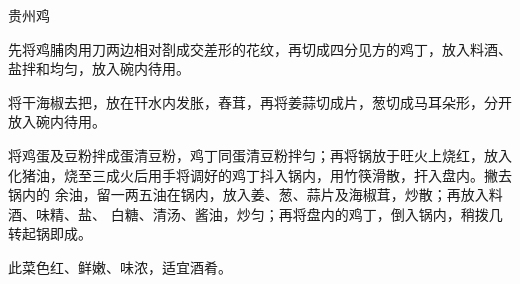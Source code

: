 \begin{recipe}{贵州鸡}

\ingredients


\preparation

\step 先将鸡脯肉用刀两边相对剳成交差形的花纹，再切成四分见方的鸡丁，放入料酒、
盐拌和均匀，放入碗内待用。

\step 将干海椒去把，放在幵水内发胀，舂茸，再将姜蒜切成片，葱切成马耳朵形，分开
放入碗内待用。

\step 将鸡蛋及豆粉拌成蛋清豆粉，鸡丁同蛋清豆粉拌匀；再将锅放于旺火上烧红，放入
化猪油，烧至三成火后用手将调好的鸡丁抖入锅内，用竹筷滑散，扞入盘内。撇去锅内的
余油，留一两五油在锅内，放入姜、葱、蒜片及海椒茸，炒散；再放入料酒、味精、盐、
白糖、清汤、酱油，炒匀；再将盘内的鸡丁，倒入锅内，稍拨几转起锅即成。

\features

此菜色红、鲜嫩、味浓，适宜酒肴。

\end{recipe}

